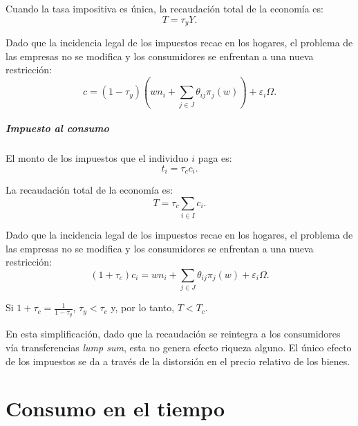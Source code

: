 \documentclass[8pt,a4paper]{extarticle}
\begin{document}
\begin{multicols}{3}
\begin{boxprop}[]
	Cuando la tasa impositiva es única, la recaudación total de la economía es:
	\[
	T = \tau_y Y
	.\] 
\end{boxprop}

\begin{boxrmk}[]
	Dado que la incidencia legal de los impuestos recae en los hogares, el problema de las empresas no se modifica y los consumidores se enfrentan a una nueva restricción:
	\[
		c = (1 - \tau_y) \left( wn_i + \sum_{j \in J} \theta_{ij} \pi_j(w) \right) + \varepsilon_i\Omega
	.\] 
\end{boxrmk}

\subsubsection{Impuesto al consumo}

El monto de los impuestos que el individuo $i$ paga es:
\[
t_i = \tau_c c_i
.\] 

\begin{boxprop}[]
	La recaudación total de la economía es:
	\[
	T = \tau_c \sum_{i \in I} c_i
	.\] 
\end{boxprop}

\begin{boxrmk}[]
	Dado que la incidencia legal de los impuestos recae en los hogares, el problema de las empresas no se modifica y los consumidores se enfrentan a una nueva restricción:
	\[
		(1 + \tau_c)c_i = wn_i + \sum_{j \in J} \theta_{ij}\pi_j(w) + \varepsilon_i\Omega
	.\] 
\end{boxrmk}

\begin{boxprop}[]
	Si $\displaystyle 1 + \tau_c = \frac{1}{1 - \tau_y}$, $\tau_y < \tau_c$ y, por lo tanto, $T < T_c$.
\end{boxprop}

\begin{boxrmk}[]
	En esta simplificación, dado que la recaudación se reintegra a los consumidores vía transferencias \emph{lump sum}, esta no genera efecto riqueza alguno. El único efecto de los impuestos se da a través de la distorsión en el precio relativo de los bienes.
\end{boxrmk}

\newpage

\part{Consumo en el tiempo}


\end{multicols}
\end{document}
